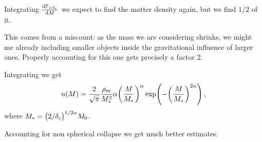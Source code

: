 \documentclass[main.tex]{subfiles}
\begin{document}
Integrating \( \dv{\mathbb{P}_{> \delta_{c}}}{M}\) we expect to find the matter density again, but we find \(1/2\) of it. 

This comes from a miscount: as the mass we are considering shrinks, we might me already including smaller objects inside the gravitational influence of larger ones. Properly accounting for this one gets precisely a factor 2. 

Integrating we get 
%
\begin{align}
n(M) = \frac{2}{\sqrt{\pi }} \frac{\rho_{m}}{M_{*}^2}
\alpha \qty(\frac{M}{M_{*}})^{\alpha }
\exp(- \qty(\frac{M}{M_{*}})^{2 \alpha })
\,,
\end{align}
%
where \(M_{*} = \qty(2 / \delta_{c})^{ 1/ 2 \alpha } M_0 \). 

Accounting for non spherical collapse we get much better estimates.
\end{document}

